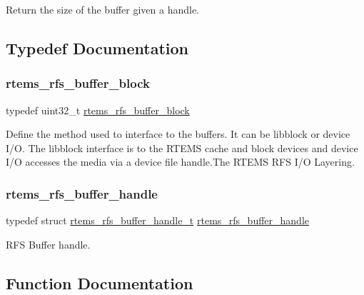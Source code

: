Return the size of the buffer given a handle. 

\subsection{Typedef Documentation}
\mbox{\label{rtems-rfs-buffer_8h_a5650d53328a5af0a78198fe780aec043}} 
\subsubsection{\texorpdfstring{rtems\_rfs\_buffer\_block}{rtems\_rfs\_buffer\_block}}
{\footnotesize\ttfamily typedef uint32\+\_\+t \mbox{\hyperlink{rtems-rfs-buffer_8h_a5650d53328a5af0a78198fe780aec043}{rtems\+\_\+rfs\+\_\+buffer\+\_\+block}}}

Define the method used to interface to the buffers. It can be libblock or device I/O. The libblock interface is to the R\+T\+E\+MS cache and block devices and device I/O accesses the media via a device file handle.\+The R\+T\+E\+MS R\+FS I/O Layering. \mbox{\label{rtems-rfs-buffer_8h_a17f97c37c5273ad28d413dfd2d175e23}} 
\subsubsection{\texorpdfstring{rtems\_rfs\_buffer\_handle}{rtems\_rfs\_buffer\_handle}}
{\footnotesize\ttfamily typedef struct \mbox{\hyperlink{structrtems__rfs__buffer__handle__t}{rtems\+\_\+rfs\+\_\+buffer\+\_\+handle\+\_\+t}}  \mbox{\hyperlink{rtems-rfs-buffer_8h_a17f97c37c5273ad28d413dfd2d175e23}{rtems\+\_\+rfs\+\_\+buffer\+\_\+handle}}}

R\+FS Buffer handle. 

\subsection{Function Documentation}
\mbox{\label{rtems-rfs-buffer_8h_ae5b347848c87353252dde82820821b05}} 
